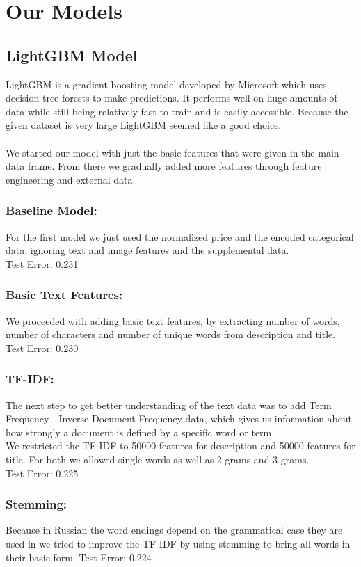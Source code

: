 \documentclass[runningheads]{llncs}
\begin{document}
\section{Our Models}
\subsection{LightGBM Model}
LightGBM is a gradient boosting model developed by Microsoft which uses decision tree forests to make predictions. It performs well on huge amounts of data while still being relatively fast to train and is easily accessible. Because the given dataset is very large LightGBM seemed like a good choice. \\\\
We started our model with just the basic features that were given in the main data frame. From there we gradually added more features through feature engineering and external data.
\subsubsection{Baseline Model:} For the first model we just used the normalized price and the encoded categorical data, ignoring text and image features and the supplemental data. \\
Test Error: 0.231
\subsubsection{Basic Text Features:} We proceeded with adding basic text features, by extracting number of words, number of characters and number of unique words from description and title. \\
Test Error: 0.230
\subsubsection{TF-IDF:} The next step to get better understanding of the text data was to add Term Frequency - Inverse Document Frequency data, which gives us information about how strongly a document is defined by a specific word or term.\\
We restricted the TF-IDF to 50000 features for description and 50000 features for title. For both we allowed single words as well as 2-grams and 3-grams.\\
Test Error: 0.225\\
\subsubsection{Stemming:} Because in Russian the word endings depend on the grammatical case they are used in we tried to improve the TF-IDF by using stemming to bring all words in their basic form.
Test Error: 0.224
\end{document}
